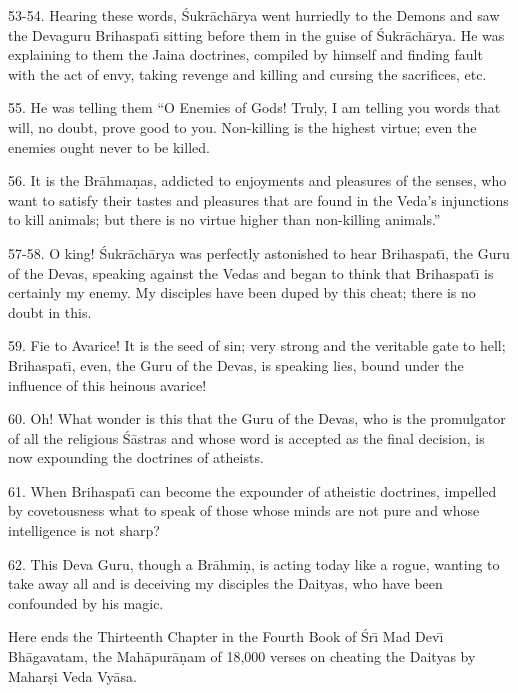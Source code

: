 53-54. Hearing these words, \'Sukr\=ach\=arya went hurriedly to the Demons and saw the Devaguru Brihaspat\={\i} sitting before them in the guise of \'Sukr\=ach\=arya. He was explaining to them the Jaina doctrines, compiled by himself and finding fault with the act of envy, taking revenge and killing and cursing the sacrifices, etc.

55. He was telling them ``O Enemies of Gods! Truly, I am telling you words that will, no doubt, prove good to you. Non-killing is the highest virtue; even the enemies ought never to be killed.

56. It is the Br\=ahma\d{n}as, addicted to enjoyments and pleasures of the senses, who want to satisfy their tastes and pleasures that are found in the Veda's injunctions to kill animals; but there is no virtue higher than non-killing animals.''

57-58. O king! \'Sukr\=ach\=arya was perfectly astonished to hear Brihaspat\={\i}, the Guru of the Devas, speaking against the Vedas and began to think that Brihaspat\={\i} is certainly my enemy. My disciples have been duped by this cheat; there is no doubt in this.

59. Fie to Avarice! It is the seed of sin; very strong and the veritable gate to hell; Brihaspat\={\i}, even, the Guru of the Devas, is speaking lies, bound under the influence of this heinous avarice!

60. Oh! What wonder is this that the Guru of the Devas, who is the promulgator of all the religious \'S\=astras and whose word is accepted as the final decision, is now expounding the doctrines of atheists.

61. When Brihaspat\={\i} can become the expounder of atheistic doctrines, impelled by covetousness what to speak of those whose minds are not pure and whose intelligence is not sharp?

62. This Deva Guru, though a Br\=ahmi\d{n}, is acting today like a rogue, wanting to take away all and is deceiving my disciples the Daityas, who have been confounded by his magic.

Here ends the Thirteenth Chapter in the Fourth Book of \'Sr\={\i} Mad Dev\={\i} Bh\=agavatam, the Mah\=apur\=a\d{n}am of 18,000 verses on cheating the Daityas by Mahar\d{s}i Veda Vy\=asa.



